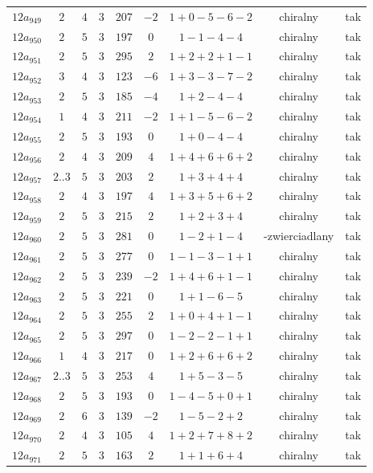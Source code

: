 \begin{longtable}{ccccccccc}
$12a_{949}$ & $2$ & $4$ & $3$ & $207$ & $-2$ & $1+0-5-6-2$ & chiralny & tak \\
$12a_{950}$ & $2$ & $5$ & $3$ & $197$ & $0$ & $1-1-4-4$ & chiralny & tak \\
$12a_{951}$ & $2$ & $5$ & $3$ & $295$ & $2$ & $1+2+2+1-1$ & chiralny & tak \\
$12a_{952}$ & $3$ & $4$ & $3$ & $123$ & $-6$ & $1+3-3-7-2$ & chiralny & tak \\
$12a_{953}$ & $2$ & $5$ & $3$ & $185$ & $-4$ & $1+2-4-4$ & chiralny & tak \\
$12a_{954}$ & $1$ & $4$ & $3$ & $211$ & $-2$ & $1+1-5-6-2$ & chiralny & tak \\
$12a_{955}$ & $2$ & $5$ & $3$ & $193$ & $0$ & $1+0-4-4$ & chiralny & tak \\
$12a_{956}$ & $2$ & $4$ & $3$ & $209$ & $4$ & $1+4+6+6+2$ & chiralny & tak \\
$12a_{957}$ & $2..3$ & $5$ & $3$ & $203$ & $2$ & $1+3+4+4$ & chiralny & tak \\
$12a_{958}$ & $2$ & $4$ & $3$ & $197$ & $4$ & $1+3+5+6+2$ & chiralny & tak \\
$12a_{959}$ & $2$ & $5$ & $3$ & $215$ & $2$ & $1+2+3+4$ & chiralny & tak \\
$12a_{960}$ & $2$ & $5$ & $3$ & $281$ & $0$ & $1-2+1-4$ & -zwierciadlany & tak \\
$12a_{961}$ & $2$ & $5$ & $3$ & $277$ & $0$ & $1-1-3-1+1$ & chiralny & tak \\
$12a_{962}$ & $2$ & $5$ & $3$ & $239$ & $-2$ & $1+4+6+1-1$ & chiralny & tak \\
$12a_{963}$ & $2$ & $5$ & $3$ & $221$ & $0$ & $1+1-6-5$ & chiralny & tak \\
$12a_{964}$ & $2$ & $5$ & $3$ & $255$ & $2$ & $1+0+4+1-1$ & chiralny & tak \\
$12a_{965}$ & $2$ & $5$ & $3$ & $297$ & $0$ & $1-2-2-1+1$ & chiralny & tak \\
$12a_{966}$ & $1$ & $4$ & $3$ & $217$ & $0$ & $1+2+6+6+2$ & chiralny & tak \\
$12a_{967}$ & $2..3$ & $5$ & $3$ & $253$ & $4$ & $1+5-3-5$ & chiralny & tak \\
$12a_{968}$ & $2$ & $5$ & $3$ & $193$ & $0$ & $1-4-5+0+1$ & chiralny & tak \\
$12a_{969}$ & $2$ & $6$ & $3$ & $139$ & $-2$ & $1-5-2+2$ & chiralny & tak \\
$12a_{970}$ & $2$ & $4$ & $3$ & $105$ & $4$ & $1+2+7+8+2$ & chiralny & tak \\
$12a_{971}$ & $2$ & $5$ & $3$ & $163$ & $2$ & $1+1+6+4$ & chiralny & tak \\

\end{longtable}
